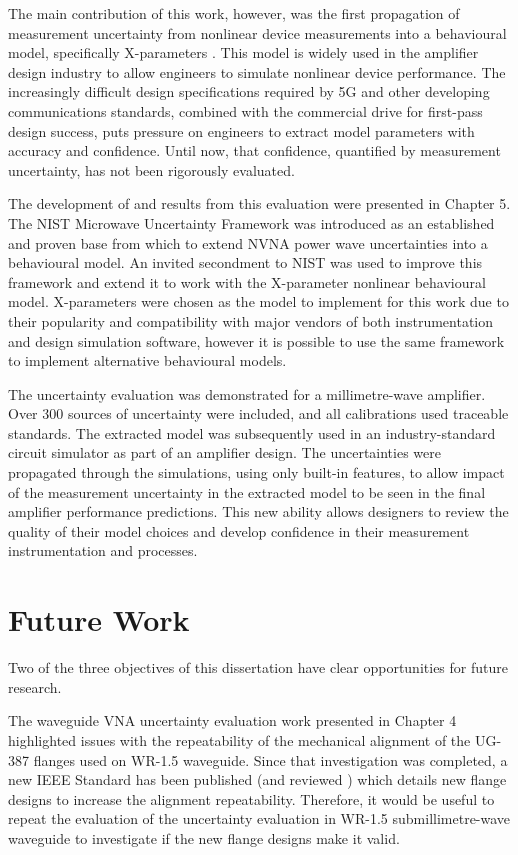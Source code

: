 \documentclass[../thesis/thesis.tex]{subfiles}
\begin{document}
\begin{refsection}
The main contribution of this work, however, was the first propagation of measurement uncertainty from nonlinear device measurements into a behavioural model, specifically X-parameters \cite{Stant_2018_TMTT}. This model is widely used in the amplifier design industry to allow engineers to simulate nonlinear device performance. The increasingly difficult design specifications required by 5G and other developing communications standards, combined with the commercial drive for first-pass design success, puts pressure on engineers to extract model parameters with accuracy and confidence. Until now, that confidence, quantified by measurement uncertainty, has not been rigorously evaluated.

The development of and results from this evaluation were presented in Chapter 5. The NIST Microwave Uncertainty Framework was introduced as an established and proven base from which to extend NVNA power wave uncertainties into a behavioural model. An invited secondment to NIST was used to improve this framework and extend it to work with the X-parameter nonlinear behavioural model. X-parameters were chosen as the model to implement for this work due to their popularity and compatibility with major vendors of both instrumentation and design simulation software, however it is possible to use the same framework to implement alternative behavioural models.

The uncertainty evaluation was demonstrated for a millimetre-wave amplifier. Over 300 sources of uncertainty were included, and all calibrations used traceable standards. The extracted model was subsequently used in an industry-standard circuit simulator as part of an amplifier design. The uncertainties were propagated through the simulations, using only built-in features, to allow impact of the measurement uncertainty in the extracted model to be seen in the final amplifier performance predictions. This new ability allows designers to review the quality of their model choices and develop confidence in their measurement instrumentation and processes.

\newpage
\section{Future Work}

Two of the three objectives of this dissertation have clear opportunities for future research.

The waveguide VNA uncertainty evaluation work presented in Chapter 4 highlighted issues with the repeatability of the mechanical alignment of the UG-387 flanges used on WR-1.5 waveguide. Since that investigation was completed, a new IEEE Standard has been published (and reviewed \cite{Ridler_2017}) which details new flange designs to increase the alignment repeatability. Therefore, it would be useful to repeat the evaluation of the uncertainty evaluation in WR-1.5 submillimetre-wave waveguide to investigate if the new flange designs make it valid.


\end{refsection}
\end{document}
